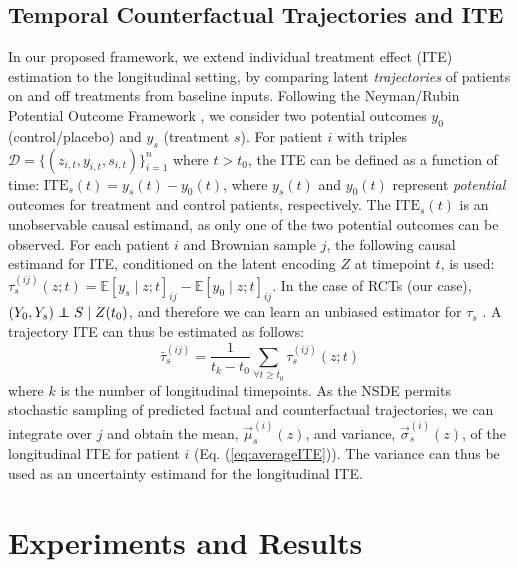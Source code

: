 \documentclass[runningheads]{llncs}
\newcommand\independent{\protect\mathpalette{\protect\independenT}{\perp}}
\def\independenT#1#2{\mathrel{\rlap{$#1#2$}\mkern2mu{#1#2}}}
\begin{document}
\subsection{Temporal Counterfactual Trajectories and ITE}
\label{sec:temp_potential}
In our proposed framework, we extend individual treatment effect (ITE) \cite{shalit2017TARNET} estimation to the longitudinal setting, by comparing latent \textit{trajectories} of patients on and off treatments from baseline inputs. Following the Neyman/Rubin Potential Outcome Framework \cite{Imbens2015}, we consider two potential outcomes $y_0$ (control/placebo) and $y_s$ (treatment $s$). For patient $i$ with triples $\mathcal{D} = \{(z_{i,t}, y_{i,t}, s_{i,t})\}_{i=1}^n$ where $t>t_0$, the ITE can be defined as a function of time:  $\text{ITE}_s(t)=y_s(t) - y_0(t)$, where $y_s(t)$ and $y_0(t)$ represent \textit{potential} outcomes for treatment and control patients, respectively.
The $\text{ITE}_s(t)$ is an unobservable causal estimand, as only one of the two potential outcomes can be observed. For each patient $i$ and Brownian sample $j$, the following causal estimand for ITE, conditioned on the latent encoding $Z$ at timepoint $t$, is used: $\tau_{s}^{(ij)}(z;t) = \mathbb{E}[y_s \mid z;t]_{ij} - \mathbb{E}[y_0\mid z;t]_{ij}$.
In the case of RCTs (our case), $(Y_0, Y_s) \independent S \mid Z(t_0)$, and therefore we can learn an unbiased estimator for  $\tau_{s}$ \cite{PearlDoCalculus}. A trajectory ITE can thus be estimated as follows: 
\begin{equation}
   \bar{\tau}_{s}^{(ij)} = \frac{1}{t_k-t_0} \sum_{\forall t \geq t_0} \tau_{s}^{(ij)}(z;t) 
   \label{eq:averageITE}
\end{equation}
where $k$ is the number of longitudinal timepoints. As the NSDE permits stochastic sampling of predicted factual and counterfactual trajectories, we can integrate over $j$ and obtain the mean, $\vec{\mu}^{(i)}_s(z)$, and variance, ${\vec{\sigma}}^{(i)}_s(z)$, of the longitudinal ITE for patient $i$ (Eq. (\ref{eq:averageITE})).
The variance can thus be used as an uncertainty estimand for the longitudinal ITE.

\section{Experiments and Results}
\label{sec:expts}
\end{document}

